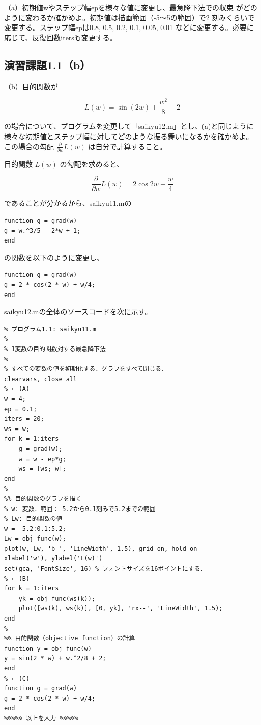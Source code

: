 \documentclass[10pt,a4paper,titlepage]{jreport} %
\begin{document}
（a）初期値wやステップ幅epを様々な値に変更し、最急降下法での収束
がどのように変わるか確かめよ。初期値は描画範囲（-5～5の範囲）で2
刻みくらいで変更する。ステップ幅epは0.8, 0.5, 0.2, 0.1, 0.05, 
0.01 などに変更する。必要に応じて、反復回数itersも変更する。\\

\subsection{演習課題1.1（b）}

（b）目的関数が

\begin{equation}
L(w) = \sin (2w) + \frac{w^2}{8} + 2
\end{equation}

の場合について、プログラムを変更して「saikyu12.m」とし、(a)と同じように
様々な初期値とステップ幅に対してどのような振る舞いになるかを確かめよ。
この場合の勾配 $\frac{ \partial }{ \partial w} L(w)$ は自分で計算すること。

目的関数 $L(w)$ の勾配を求めると、

\begin{equation}
\frac{ \partial }{ \partial w} L(w) = 2\cos{2w} + \frac{w}{4}
\end{equation}

であることが分かるから、saikyu11.mの

\begin{verbatim}
function g = grad(w)
g = w.^3/5 - 2*w + 1;
end
\end{verbatim}

の関数を以下のように変更し、

\begin{verbatim}
function g = grad(w)
g = 2 * cos(2 * w) + w/4;
end
\end{verbatim}

saikyu12.mの全体のソースコードを次に示す。

\begin{lstlisting}[caption=saikyu12]
  %%%%% 以下を入力 %%%%%
% プログラム1.1: saikyu11.m
%
% 1変数の目的関数対する最急降下法
%
% すべての変数の値を初期化する．グラフをすべて閉じる．
clearvars, close all
% ← (A)
w = 4;
ep = 0.1;
iters = 20;
ws = w;
for k = 1:iters
    g = grad(w);
    w = w - ep*g;
    ws = [ws; w];
end
%
%% 目的関数のグラフを描く
% w: 変数．範囲：-5.2から0.1刻みで5.2までの範囲
% Lw: 目的関数の値
w = -5.2:0.1:5.2;
Lw = obj_func(w);
plot(w, Lw, 'b-', 'LineWidth', 1.5), grid on, hold on
xlabel('w'), ylabel('L(w)')
set(gca, 'FontSize', 16) % フォントサイズを16ポイントにする．
% ← (B)
for k = 1:iters
    yk = obj_func(ws(k));
    plot([ws(k), ws(k)], [0, yk], 'rx--', 'LineWidth', 1.5);
end
%
%% 目的関数（objective function）の計算
function y = obj_func(w)
y = sin(2 * w) + w.^2/8 + 2;
end
% ← (C)
function g = grad(w)
g = 2 * cos(2 * w) + w/4;
end
%%%%% 以上を入力 %%%%%
\end{lstlisting}
\end{document}
